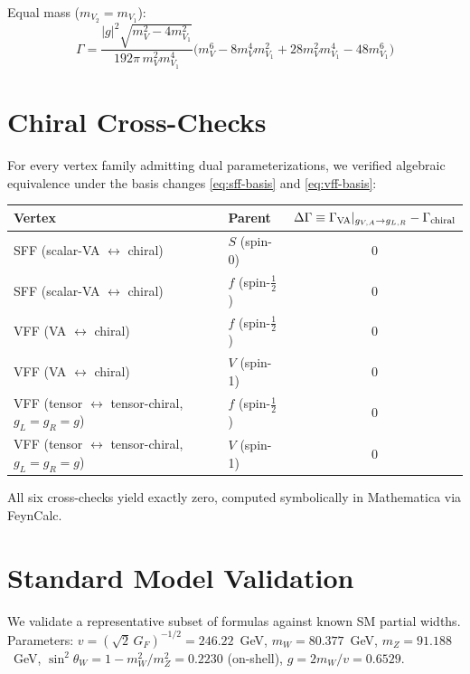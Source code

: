 \documentclass[11pt,a4paper]{article}
\newcommand{\beq}{\begin{equation}}
\newcommand{\eeq}{\end{equation}}
\begin{document}
Equal mass ($m_{V_2}=m_{V_1}$):
\beq
\Gamma = \frac{|g|^2\sqrt{m_V^2-4m_{V_1}^2}}{192\pi\, m_V^2 m_{V_1}^4}
\bigl(m_V^6-8m_V^4 m_{V_1}^2+28m_V^2 m_{V_1}^4-48m_{V_1}^6\bigr)
\label{eq:VVV-equal}
\eeq

\section{Chiral Cross-Checks}
\label{sec:crosscheck}

For every vertex family admitting dual parameterizations, we verified algebraic equivalence
under the basis changes \eqref{eq:sff-basis} and \eqref{eq:vff-basis}:

\begin{center}
\begin{tabular}{llc}
\toprule
Vertex & Parent & $\Delta\Gamma \equiv \Gamma_{\rm VA}|_{g_{V,A}\to g_{L,R}} - \Gamma_{\rm chiral}$ \\
\midrule
SFF (scalar-VA $\leftrightarrow$ chiral) & $S$ (spin-0) & $0$ \\
SFF (scalar-VA $\leftrightarrow$ chiral) & $f$ (spin-$\frac{1}{2}$) & $0$ \\
VFF (VA $\leftrightarrow$ chiral) & $f$ (spin-$\frac{1}{2}$) & $0$ \\
VFF (VA $\leftrightarrow$ chiral) & $V$ (spin-1) & $0$ \\
VFF (tensor $\leftrightarrow$ tensor-chiral, $g_L=g_R=g$) & $f$ (spin-$\frac{1}{2}$) & $0$ \\
VFF (tensor $\leftrightarrow$ tensor-chiral, $g_L=g_R=g$) & $V$ (spin-1) & $0$ \\
\bottomrule
\end{tabular}
\end{center}

All six cross-checks yield exactly zero, computed symbolically in Mathematica via FeynCalc.

\section{Standard Model Validation}
\label{sec:sm}

We validate a representative subset of formulas against known SM partial widths.
Parameters: $v = (\sqrt{2}\,G_F)^{-1/2} = 246.22$~GeV, $m_W = 80.377$~GeV, $m_Z = 91.188$~GeV,
$\sin^2\theta_W = 1 - m_W^2/m_Z^2 = 0.2230$ (on-shell), $g = 2m_W/v = 0.6529$.
\end{document}
